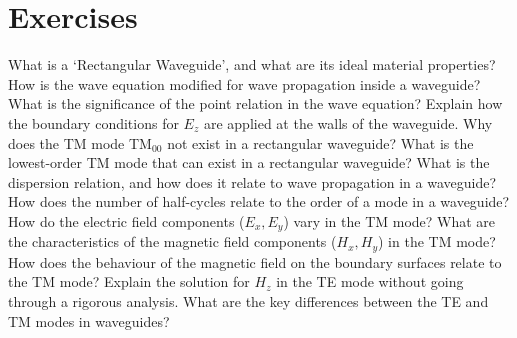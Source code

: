 \section*{Exercises}
\begin{ExerciseList}
\Exercise[label={ex381}]
What is a `Rectangular Waveguide', and what are its ideal material properties?
\Exercise[label={ex382}]
How is the wave equation modified for wave propagation inside a waveguide?
\Exercise[label={ex383}]
What is the significance of the point relation in the wave equation?
\Exercise[label={ex384}]
Explain how the boundary conditions for $E_z$ are applied at the walls of the waveguide.
\Exercise[label={ex385}]
Why does the TM mode TM$_{00}$ not exist in a rectangular waveguide?
\Exercise[label={ex386}]
What is the lowest-order TM mode that can exist in a rectangular waveguide?
\Exercise[label={ex387}]
What is the dispersion relation, and how does it relate to wave propagation in a waveguide?
\Exercise[label={ex388}]
How does the number of half-cycles relate to the order of a mode in a waveguide?
\Exercise[label={ex389}]
How do the electric field components ($E_x, E_y$) vary in the TM mode?
\Exercise[label={ex3810}]
What are the characteristics of the magnetic field components ($H_x, H_y$) in the TM mode?
\Exercise[label={ex3811}]
How does the behaviour of the magnetic field on the boundary surfaces relate to the TM mode?
\Exercise[label={ex3812}]
Explain the solution for $H_z$ in the TE mode without going through a rigorous analysis.
\Exercise[label={ex3813}]
What are the key differences between the TE and TM modes in waveguides?
\end{ExerciseList}
